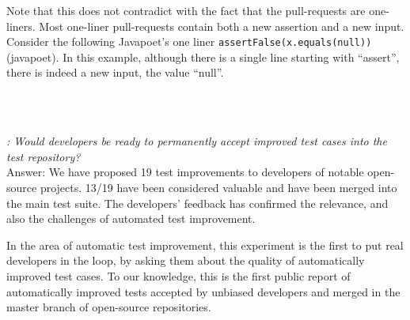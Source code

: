\documentclass[table,xcdraw,smallextended]{svjour3}
\begin{document}
Note that this does not contradict with the fact that the pull-requests are one-liners. Most one-liner pull-requests contain both a new assertion and a new input. Consider the following Javapoet's one liner \texttt{assertFalse(x.equals(null))} (javapoet). In this example, although there is a single line starting with ``assert'', there is indeed a new input, the value ``null''.

~\\
~\\
\begin{mdframed}
\textit{\rqpullrequest: Would developers be ready to permanently accept improved test cases into the test repository?}\\
Answer: We have proposed 19 test improvements to developers of notable open-source projects. 13/19 have been considered valuable and have been merged into the main test suite. The developers' feedback has confirmed the relevance, and also the challenges of automated test improvement.
\end{mdframed}

In the area of automatic test improvement, this experiment is the first to put real developers in the loop, by asking them about the quality of automatically improved test cases. To our knowledge, this is the first public report of automatically improved tests accepted by unbiased developers and merged in the master branch of open-source repositories.
\end{document}
